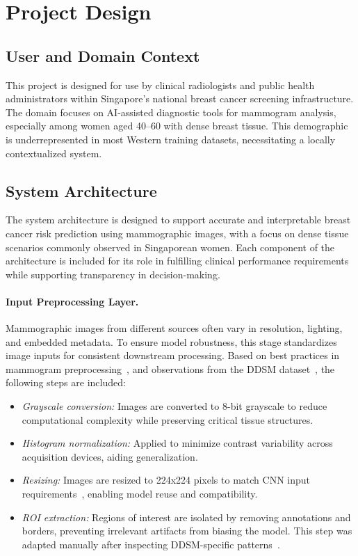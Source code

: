 \documentclass[12pt]{article}
\begin{document}
\section{Project Design}

\subsection{User and Domain Context}
This project is designed for use by clinical radiologists and public health administrators within Singapore’s national breast cancer screening infrastructure. The domain focuses on AI-assisted diagnostic tools for mammogram analysis, especially among women aged 40–60 with dense breast tissue. This demographic is underrepresented in most Western training datasets, necessitating a locally contextualized system.

\subsection{System Architecture}

The system architecture is designed to support accurate and interpretable breast cancer risk prediction using mammographic images, with a focus on dense tissue scenarios commonly observed in Singaporean women. Each component of the architecture is included for its role in fulfilling clinical performance requirements while supporting transparency in decision-making.

\paragraph{Input Preprocessing Layer.}
Mammographic images from different sources often vary in resolution, lighting, and embedded metadata. To ensure model robustness, this stage standardizes image inputs for consistent downstream processing. Based on best practices in mammogram preprocessing~\cite{7,14}, and observations from the DDSM dataset~\cite{17}, the following steps are included:

\begin{itemize}
    \item \textit{Grayscale conversion:} Images are converted to 8-bit grayscale to reduce computational complexity while preserving critical tissue structures.
    \item \textit{Histogram normalization:} Applied to minimize contrast variability across acquisition devices, aiding generalization.
    \item \textit{Resizing:} Images are resized to 224x224 pixels to match CNN input requirements~\cite{1}, enabling model reuse and compatibility.
    \item \textit{ROI extraction:} Regions of interest are isolated by removing annotations and borders, preventing irrelevant artifacts from biasing the model. This step was adapted manually after inspecting DDSM-specific patterns~\cite{17}.
\end{itemize}
\end{document}
